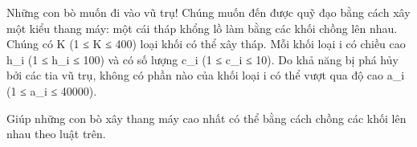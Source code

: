 Những con bò muốn đi vào vũ trụ! Chúng muốn đến được quỹ đạo bằng cách xây một kiểu thang máy: một cái tháp khổng lồ làm bằng các khối chồng lên nhau. Chúng có K (1 ≤ K ≤ 400) loại khối có thể xây tháp. Mỗi khối loại i có chiều cao h\_i (1 ≤ h\_i ≤ 100) và có số lượng c\_i (1 ≤ c\_i ≤ 10). Do khả năng bị phá hủy bởi các tia vũ trụ, không có phần nào của khối loại i có thể vượt qua độ cao a\_i (1 ≤ a\_i ≤ 40000).

Giúp những con bò xây thang máy cao nhất có thể bằng cách chồng các khối lên nhau theo luật trên.

\